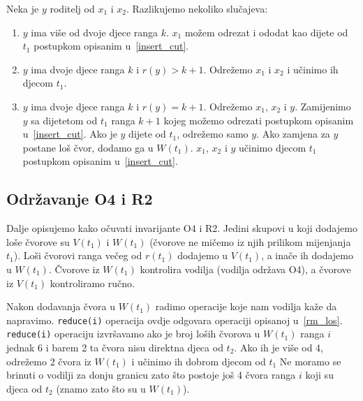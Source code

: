 Neka je $y$ roditelj od $x_{1}$ i $x_{2}$.
Razlikujemo nekoliko slu\v{c}ajeva:
\begin{enumerate}
  \item $y$ ima vi\v{s}e od dvoje djece ranga $k$.
        $x_{1}$ mo\v{z}em odrezat i ododat kao dijete od $t_{1}$ postupkom opisanim u~\ref{insert_cut}.
  \item $y$ ima dvoje djece ranga $k$ i $r(y) > k+1$.
        Odre\v{z}emo $x_{1}$ i $x_{2}$ i u\v{c}inimo ih djecom $t_{1}$.
  \item $y$ ima dvoje djece ranga $k$ i $r(y) = k+1$.
        Odre\v{z}emo $x_{1}$, $x_{2}$ i $y$. Zamijenimo $y$ sa dijetetom od $t_{1}$ ranga $k+1$ kojeg mo\v{z}emo odrezati postupkom opisanim u~\ref{insert_cut}.
        Ako je $y$ dijete od $t_{1}$, odre\v{z}emo samo $y$.
        Ako zamjena za $y$ postane lo\v{s} \v{c}vor, dodamo ga u $W(t_{1})$.
        $x_{1}$, $x_{2}$ i $y$ u\v{c}inimo djecom $t_{1}$ postupkom opisanim u~\ref{insert_cut}.
\end{enumerate}

\subsection{Odr\v{z}avanje O4 i R2}

Dalje opisujemo kako o\v{c}uvati invarijante O4 i R2.
Jedini skupovi u koji dodajemo lo\v{s}e \v{c}vorove su $V(t_{1})$ i $W(t_{1})$ (\v{c}vorove ne mi\v{c}emo iz njih prilikom mijenjanja $t_{1}$).
Lo\v{s}i \v{c}vorovi ranga ve\v{c}eg od $r(t_{1})$ dodajemo u $V(t_{1})$, a ina\v{c}e ih dodajemo u $W(t_{1})$.
\v{C}vorove iz $W(t_{1})$ kontrolira vodilja (vodilja odr\v{z}ava O4), a \v{c}vorove iz $V(t_{1})$ kontroliramo ru\v{c}no.

Nakon dodavanja \v{c}vora u $W(t_{1})$ radimo operacije koje nam vodilja ka\v{z}e da napravimo.
\texttt{reduce(i)} operacija ovdje odgovara operaciji opisanoj u~\ref{rm_los}.
\texttt{reduce(i)} operaciju izvr\v{s}avamo ako je broj lo\v{s}ih \v{c}vorova u $W(t_{1})$ ranga $i$ jednak 6 i barem 2 ta \v{c}vora nisu direktna djeca od $t_{2}$.
Ako ih je vi\v{s}e od 4, odre\v{z}emo 2 \v{c}vora iz $W(t_{1})$ i u\v{c}inimo ih dobrom djecom od $t_{1}$
Ne moramo se brinuti o vodilji za donju granicu zato \v{s}to postoje jo\v{s} 4 \v{c}vora ranga $i$ koji su djeca od $t_{2}$ (znamo zato \v{s}to su u $W(t_{1})$).

